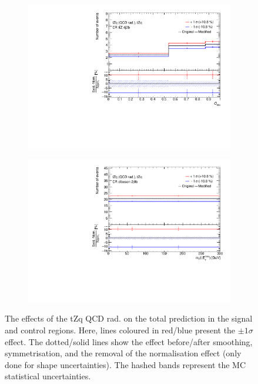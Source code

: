 \begin{figure}[!h]
\begin{subfigure}[b]{0.33\linewidth}
  \includegraphics[width=\textwidth]{ubonn-thesis/Chapters/Chapters_07/Figure/Data/Systematic/tZq_qcdrad/CR_4j2b_tZq_tZq_XS_QCDscale.pdf} 
    \caption{}
  \end{subfigure} 
  \centering
  \begin{subfigure}[b]{0.33\linewidth}
    \includegraphics[width=\textwidth]{ubonn-thesis/Chapters/Chapters_07/Figure/Data/Systematic/tZq_qcdrad/CR_2j0b_tZq_tZq_XS_QCDscale.pdf} 
    \caption{}
  \end{subfigure}
  \caption{ The effects of the tZq QCD rad. on the total prediction in the signal and control regions. Here, lines coloured in red/blue present the $\pm 1 \sigma$ effect. The dotted/solid lines show the effect before/after smoothing, symmetrisation, and the removal of the normalisation effect (only done for shape uncertainties). The hashed bands represent the MC statistical uncertainties.}
  \label{fig:systQCD}
  \end{figure}


